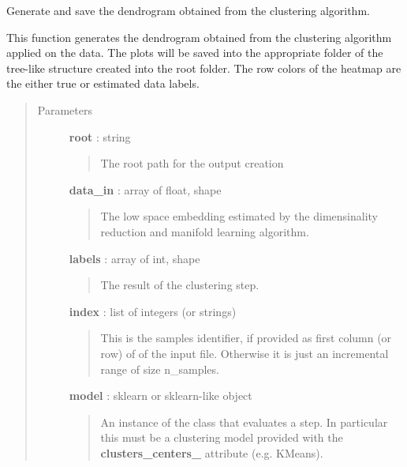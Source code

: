 \documentclass[letterpaper,10pt,english]{sphinxmanual}
\begin{document}

\begin{fulllineitems}
\label{index:adenine.core.plotting.dendrogram}
Generate and save the dendrogram obtained from the clustering algorithm.

This function generates the dendrogram obtained from the clustering
algorithm applied on the data. The plots will be saved into the appropriate
folder of the tree-like structure created into the root folder. The row
colors of the heatmap are the either true or estimated data labels.
\begin{quote}\begin{description}
\item[{Parameters}] \leavevmode
\textbf{root} : string
\begin{quote}

The root path for the output creation
\end{quote}

\textbf{data\_in} : array of float, shape
\begin{quote}

The low space embedding estimated by the dimensinality reduction and
manifold learning algorithm.
\end{quote}

\textbf{labels} : array of int, shape
\begin{quote}

The result of the clustering step.
\end{quote}

\textbf{index} : list of integers (or strings)
\begin{quote}

This is the samples identifier, if provided as first column (or row) of
of the input file. Otherwise it is just an incremental range of size
n\_samples.
\end{quote}

\textbf{model} : sklearn or sklearn-like object
\begin{quote}

An instance of the class that evaluates a step. In particular this must
be a clustering model provided with the {\color{red}\bfseries{}clusters\_centers\_} attribute
(e.g. KMeans).
\end{quote}


\end{description}
\end{quote}
\end{fulllineitems}
\end{document}
